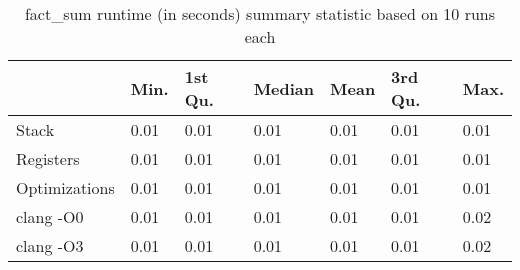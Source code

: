 \begin{table}[h!]
\centering
\begin{tabular}{p{}p{}p{}p{}p{}p{}p{}}
  \hline
 & Min. & 1st Qu. & Median & Mean & 3rd Qu. & Max. \\ 
  \hline
Stack & 0.01 & 0.01 & 0.01 & 0.01 & 0.01 & 0.01 \\ 
  Registers & 0.01 & 0.01 & 0.01 & 0.01 & 0.01 & 0.01 \\ 
  Optimizations & 0.01 & 0.01 & 0.01 & 0.01 & 0.01 & 0.01 \\ 
  clang -O0 & 0.01 & 0.01 & 0.01 & 0.01 & 0.01 & 0.02 \\ 
  clang -O3 & 0.01 & 0.01 & 0.01 & 0.01 & 0.01 & 0.02 \\ 
   \hline
\end{tabular}
\caption{fact\_sum runtime (in seconds) summary statistic based on 10 runs each}
\end{table}
